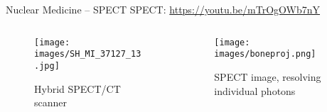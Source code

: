 \begin{frame}[c]{Nuclear Medicine -- SPECT}
SPECT: \href{https://youtu.be/mTrOgOWb7nY}{https://youtu.be/mTrOgOWb7nY}

	\begin{columns}[c, onlytextwidth]
		\begin{column}{0.5\textwidth}
			\centering{}
			\begin{figure}[k]
				\centering

				\texttt{[image: images/SH\_MI\_37127\_13.jpg]}
				\caption{Hybrid SPECT/CT scanner}
			\end{figure}
		\end{column}\begin{column}{0.5\textwidth}
			\begin{figure}
				\centering{}
				\texttt{[image: images/boneproj.png]}
				\caption{SPECT image, resolving individual photons}
			\end{figure}
		\end{column}
	\end{columns}

\end{frame}
